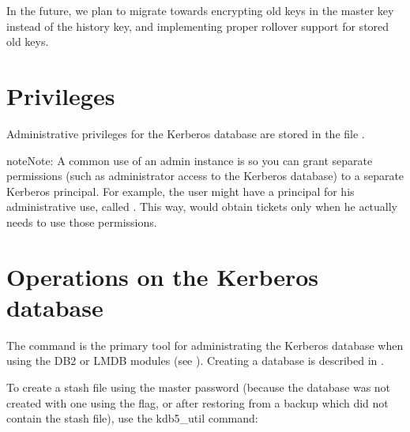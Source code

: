 \documentclass[letterpaper,10pt,english]{sphinxmanual}
\begin{document}
\sphinxAtStartPar
In the future, we plan to migrate towards encrypting old keys in the
master key instead of the history key, and implementing proper
rollover support for stored old keys.


\section{Privileges}
\label{\detokenize{admin/database:privileges}}\label{\detokenize{admin/database:id3}}
\sphinxAtStartPar
Administrative privileges for the Kerberos database are stored in the
file {\hyperref[\detokenize{admin/conf_files/kadm5_acl:kadm5-acl-5}]{}}.

\begin{sphinxadmonition}{note}{Note:}
\sphinxAtStartPar
A common use of an admin instance is so you can grant
separate permissions (such as administrator access to the
Kerberos database) to a separate Kerberos principal. For
example, the user  might have a principal for
his administrative use, called .  This
way,  would obtain  tickets
only when he actually needs to use those permissions.
\end{sphinxadmonition}


\section{Operations on the Kerberos database}
\label{\detokenize{admin/database:operations-on-the-kerberos-database}}\label{\detokenize{admin/database:db-operations}}
\sphinxAtStartPar
The {\hyperref[\detokenize{admin/admin_commands/kdb5_util:kdb5-util-8}]{}} command is the primary tool for administrating
the Kerberos database when using the DB2 or LMDB modules (see
{\hyperref[\detokenize{admin/dbtypes:dbtypes}]{}}).  Creating a database is described in
{\hyperref[\detokenize{admin/install_kdc:create-db}]{}}.

\sphinxAtStartPar
To create a stash file using the master password (because the database
was not created with one using the  flag, or after
restoring from a backup which did not contain the stash file), use the
kdb5\_util  command:
\end{document}
